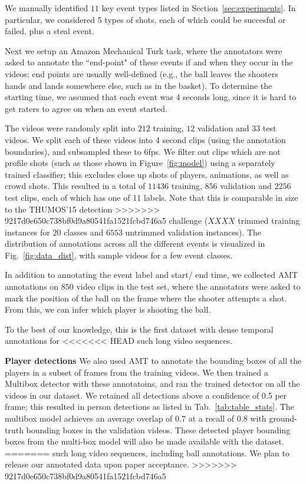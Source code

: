 We manually identified $11$ key event types
listed in Section~\ref{sec:experiments}.
In particular, we considered 
5 types of shots, each of which could be succesful or failed,
plus a steal event. 

Next we setup an Amazon Mechanical Turk task, where the
annotators were asked to annotate the ``end-point" of these events if and when
they occur in the videos; end points are usually well-defined (e.g.,
the ball leaves the shooters hands and lands somewhere else, such as
in the basket).
To determine the starting time, we assumed that each event was 4
seconds long, since it is hard to get raters to agree on when an event
started. 


The videos were randomly split into $212$ training, $12$ validation and $33$
test videos. 
We split each of these videos into 4 second clips (using the
annotation boundaries), and subsampled these to 6fps.
We filter out clips which are not profile shots (such as those shown in
Figure~\ref{fig:model}) using a separately trained classifier; this excludes close up shots of players, animations, as
well as crowd shots.
This resulted in a total of $11436$ training, $856$ validation
and $2256$ test clips, each of which has one of 11 labels.
Note that this is comparable in size to the THUMOS'15 detection
>>>>>>> 9217d0e650c738bf0d9a80541fa1521fcbd746a5
challenge ($XXXX$ trimmed training instances for $20$ classes and $6553$
untrimmed validation instances). The distribution of annotations across all the
different events is visualized in Fig.~\ref{fig:data_dist}, with sample videos
for a few event classes. 

In addition to annotating the event label and start/ end time,
we collected AMT annotations on $850$ video clips in the test
set, where the annotators were asked to mark the position of the ball
on the frame where the shooter attempts a shot.
From this, we can infer which player is shooting the ball.

To the best of our
knowledge, this is the first dataset with dense temporal annotations for
<<<<<<< HEAD
such long video sequences.

\noindent \textbf{Player detections}
We also used AMT to annotate the bounding boxes of all the players in a
subset  of frames from the training videos.
We then trained a Multibox detector \cite{Szegedy_arxiv14}
with these annotatoins, and ran the trained detector on all the videos in our dataset.
We retained all detections above a confidence of 0.5 per frame;
this resulted in person detections as listed in Tab.~\ref{tab:table_stats}.
The multibox model achieves an average overlap of $0.7$ at a recall of $0.8$
with ground-truth bounding boxes in the validation videos.
These detected player bounding boxes from the
multi-box model will also be made available with the dataset.
=======
such long video sequences, including ball annotations.
We plan to release our annotated data upon paper
acceptance.
>>>>>>> 9217d0e650c738bf0d9a80541fa1521fcbd746a5
